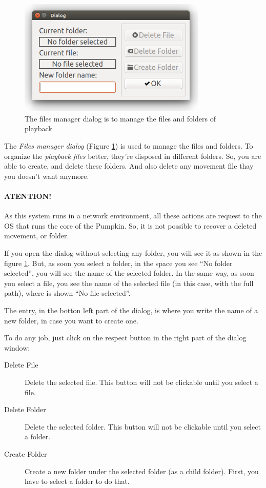 \documentclass[oneside,a4paper,titlepage]{article}
\begin{document}
\begin{figure}[ht!]
	\centering
	\includegraphics[width=0.8\textwidth]{manage_files}
	\caption[Files Manager]{The files manager dialog is to manage the files and folders of playback}
	\label{fig:manage_files}
\end{figure}

The \emph{Files manager dialog} (Figure \ref{fig:manage_files}) is used to manage the files and folders. To organize the \emph{playback files} better, they're disposed in different folders. So, you are able to create, and delete these folders. And also delete any movement file thay you doesn't want anymore.

{\color{red}
\paragraph{ATENTION!} As this system runs in a network environment, all these actions are request to the OS that runs the core of the Pumpkin. So, it is not possible to recover a deleted movement, or folder.
}

If you open the dialog without selecting any folder, you will see it as shown in the figure \ref{fig:manage_files}. But, as soon you select a folder, in the space you see ``No folder selected'', you will see the name of the selected folder. In the same way, as soon you select a file, you see the name of the selected file (in this case, with the full path), where is shown ``No file selected''.

The entry, in the botton left part of the dialog, is where you write the name of a new folder, in case you want to create one.

To do any job, just click on the respect button in the right part of the dialog window:

\begin{description}
	\item[Delete File] Delete the selected file. This button will not be clickable until you select a file.
	
	\item[Delete Folder] Delete the selected folder. This button will not be clickable until you select a folder.
	
	\item[Create Folder] Create a new folder under the selected folder (as a child folder). First, you have to select a folder to do that.
\end{description}
\end{document}
